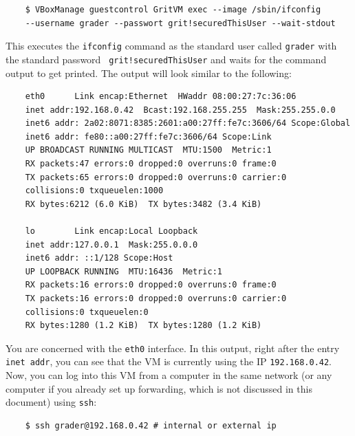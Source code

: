 \documentclass[10pt,a4paper, titlepage, toc=idx]{scrreprt}
\theoremstyle{definition}
\theoremstyle{plain}
\begin{document}
	\begin{lstlisting}
	$ VBoxManage guestcontrol GritVM exec --image /sbin/ifconfig
	--username grader --passwort grit!securedThisUser --wait-stdout
\end{lstlisting}
	
	This executes the {\tt ifconfig} command as the standard user
        called {\tt grader} with the standard password {\tt
          grit!securedThisUser} and waits for the command output to
        get printed. The output will look similar to the following:
\begin{lstlisting}
	eth0      Link encap:Ethernet  HWaddr 08:00:27:7c:36:06  
	inet addr:192.168.0.42  Bcast:192.168.255.255  Mask:255.255.0.0
	inet6 addr: 2a02:8071:8385:2601:a00:27ff:fe7c:3606/64 Scope:Global
	inet6 addr: fe80::a00:27ff:fe7c:3606/64 Scope:Link
	UP BROADCAST RUNNING MULTICAST  MTU:1500  Metric:1
	RX packets:47 errors:0 dropped:0 overruns:0 frame:0
	TX packets:65 errors:0 dropped:0 overruns:0 carrier:0
	collisions:0 txqueuelen:1000 
	RX bytes:6212 (6.0 KiB)  TX bytes:3482 (3.4 KiB)
	
	lo        Link encap:Local Loopback  
	inet addr:127.0.0.1  Mask:255.0.0.0
	inet6 addr: ::1/128 Scope:Host
	UP LOOPBACK RUNNING  MTU:16436  Metric:1
	RX packets:16 errors:0 dropped:0 overruns:0 frame:0
	TX packets:16 errors:0 dropped:0 overruns:0 carrier:0
	collisions:0 txqueuelen:0 
	RX bytes:1280 (1.2 KiB)  TX bytes:1280 (1.2 KiB)	
\end{lstlisting}
	You are concerned with the {\tt eth0} interface. In this
        output, right after the entry {\tt inet addr}, you can see
        that the VM is currently using the IP {\tt 192.168.0.42}. Now,
        you can log into this VM from a computer in the same network
        (or any computer if you already set up forwarding, which is
        not discussed in this document) using {\tt ssh}:
\begin{lstlisting}
	$ ssh grader@192.168.0.42 # internal or external ip
\end{lstlisting}
\end{document}
